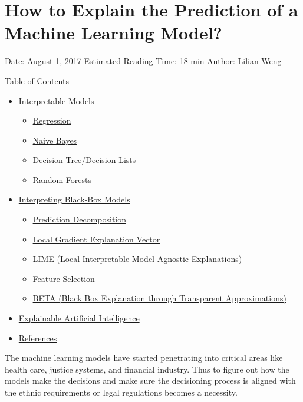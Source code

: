 \section{How to Explain the Prediction of a Machine Learning Model?}\label{how-to-explain-the-prediction-of-a-machine-learning-model}

Date: August 1, 2017 \textbar{} Estimated Reading Time: 18 min \textbar{} Author: Lilian Weng

{Table of Contents}

\begin{itemize}
\tightlist
\item
  \hyperref[interpretable-models]{Interpretable Models}

  \begin{itemize}
  \tightlist
  \item
    \hyperref[regression]{Regression}
  \item
    \hyperref[naive-bayes]{Naive Bayes}
  \item
    \hyperref[decision-treedecision-lists]{Decision Tree/Decision Lists}
  \item
    \hyperref[random-forests]{Random Forests}
  \end{itemize}
\item
  \hyperref[interpreting-black-box-models]{Interpreting Black-Box Models}

  \begin{itemize}
  \tightlist
  \item
    \hyperref[prediction-decomposition]{Prediction Decomposition}
  \item
    \hyperref[local-gradient-explanation-vector]{Local Gradient Explanation Vector}
  \item
    \hyperref[lime-local-interpretable-model-agnostic-explanations]{LIME (Local Interpretable Model-Agnostic Explanations)}
  \item
    \hyperref[feature-selection]{Feature Selection}
  \item
    \hyperref[beta-black-box-explanation-through-transparent-approximations]{BETA (Black Box Explanation through Transparent Approximations)}
  \end{itemize}
\item
  \hyperref[explainable-artificial-intelligence]{Explainable Artificial Intelligence}
\item
  \hyperref[references]{References}
\end{itemize}

The machine learning models have started penetrating into critical areas like health care, justice systems, and financial industry. Thus to figure out how the models make the decisions and make sure the decisioning process is aligned with the ethnic requirements or legal regulations becomes a necessity.

